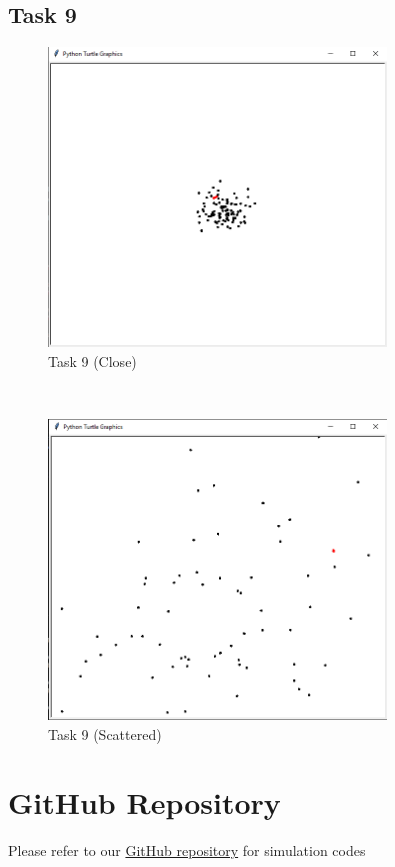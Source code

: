 \documentclass[answers]{exam}
\begin{document}
\subsection{Task 9}
    \begin{figure}[H]
        \centering
        \includegraphics[width = 0.8\textwidth]{Graphs/9a.png}
        \caption{Task 9 (Close)}
        \label{fig:task9_a}
    \end{figure}\\
    \begin{figure}[H]
        \centering
        \includegraphics[width = 0.8\textwidth]{Graphs/9b.png}
        \caption{Task 9 (Scattered)}
        \label{fig:task9_b}
    \end{figure}

\section{GitHub Repository}
Please refer to our \href{https://github.com/FasihHussain22/Probability-Project/tree/master}{GitHub repository} for simulation codes
\end{document}
